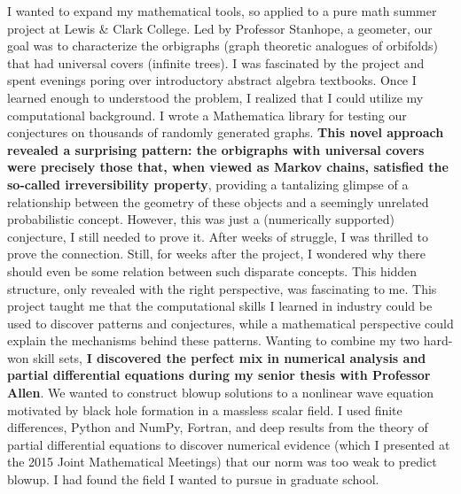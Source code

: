 \documentclass[12pt]{article}
\begin{document}
I wanted to expand my mathematical tools, so applied to a pure math summer project at Lewis \& Clark College. Led by Professor Stanhope, a geometer, our goal was to characterize the orbigraphs (graph theoretic analogues of orbifolds) that had universal covers (infinite trees). I was fascinated by the project and spent evenings poring over introductory abstract algebra textbooks. Once I learned enough to understood the problem, I realized that I could utilize my computational background. I wrote a Mathematica library for testing our conjectures on thousands of randomly generated graphs. \textbf{This novel approach revealed a surprising pattern: the orbigraphs with universal covers were precisely those that, when viewed as Markov chains, satisfied the so-called irreversibility property}, providing a tantalizing glimpse of a relationship between the geometry of these objects and a seemingly unrelated probabilistic concept. However, this was just a (numerically supported) conjecture, I still needed to prove it. After weeks of struggle, I was thrilled to prove the connection. Still, for weeks after the project, I wondered why there should even be some relation between such disparate concepts. This hidden structure, only revealed with the right perspective, was fascinating to me. This project taught me that the computational skills I learned in industry could be used to discover patterns and conjectures, while a mathematical perspective could explain the mechanisms behind these patterns. Wanting to combine my two hard-won skill sets, \textbf{I discovered the perfect mix in numerical analysis and partial differential equations during my senior thesis with Professor Allen}. We wanted to construct blowup solutions to a nonlinear wave equation motivated by black hole formation in a massless scalar field. I used finite differences, Python and NumPy, Fortran, and deep results from the theory of partial differential equations to discover numerical evidence (which I presented at the 2015 Joint Mathematical Meetings) that our norm was too weak to predict blowup. I had found the field I wanted to pursue in graduate school.
\end{document}
